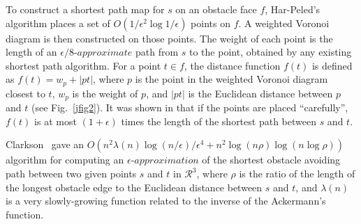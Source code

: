 \documentclass{llncs}
\begin{document}
To construct a shortest path map for $s$
on an obstacle face $f$, Har-Peled's algorithm places a set of
$O(1/\epsilon^2\log1/\epsilon)$ points on $f$. A weighted Voronoi
diagram is then constructed on those points.
The weight of each point is the length of an $\epsilon/8$-$approximate$ path from $s$ to the point,
obtained by any
existing shortest path algorithm. For a point $t\in f$, the distance function $f(t)$ is defined as
$f(t)=w_{p}+|pt|$,
where $p$ is the point in the weighted Voronoi diagram closest
to $t$, $w_{p}$ is the
weight of $p$, and $|pt|$ is the Euclidean distance between $p$ and $t$ (see Fig.~\ref{jfig2}).
It was shown in \cite{Sar99} that
if the points are placed ``carefully'', $f(t)$ is at most $(1+\epsilon)$ times the length of the shortest
path between $s$ and $t$.


Clarkson~\cite{Clar87} gave an
$O(n^2\lambda(n)\log(n/\epsilon)/{\epsilon}^4+n^2\log (n\rho) \log(n\log\rho))$
algorithm for computing an $\epsilon$-$approximation$ of the shortest obstacle avoiding path
between two given points $s$ and $t$ in
$\mathcal{R}^3$, where $\rho$ is the ratio of the length of the longest obstacle edge to the
Euclidean distance between $s$ and $t$, and $\lambda(n)$ is a very slowly-growing function related to
the inverse of the Ackermann's function.
\end{document}
